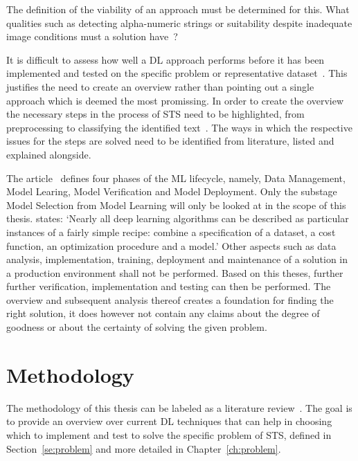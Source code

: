 The definition of the viability of an approach must be determined for this.
What qualities such as detecting alpha-numeric strings or suitability despite
inadequate image conditions must a solution have~\citep{ghosh_visual_2017, hu_gtc_2020}?

It is difficult to assess how well a \ac{DL} approach performs before it has been
implemented and tested on the specific problem or representative dataset~\citep{arpteg_software_2018}.
This justifies the need to create an overview rather than pointing out a single approach which is
deemed the most promissing.
In order to create the overview the necessary steps in the process of \ac{STS} need to be highlighted,
from preprocessing to classifying the identified
text~\citep{long_scene_2021, sourvanos_challenges_2018}.
The ways in which the respective issues for the steps are solved need to be
identified from literature, listed and explained alongside.

The article~\cite{ashmore_assuring_2021} defines four phases of the \ac{ML} lifecycle, namely,
Data Management, Model Learing, Model Verification and Model Deployment.
Only the substage Model Selection from Model Learning will only be looked at in the scope of this
thesis.
\cite{goodfellow_deep_2016} states:
`Nearly all deep learning algorithms can be described as particular instances of a fairly simple
recipe: combine a specification of a dataset, a cost function, an optimization procedure and a model.'
Other aspects such as data analysis, implementation, training, deployment and maintenance of a
solution in a production environment shall not be performed.
Based on this theses, further further verification, implementation and testing can then be performed.
The overview and subsequent analysis thereof creates a foundation for finding the right solution,
it does however not contain any claims about the degree of goodness or about the certainty of
solving the given problem.

\begin{comment}
Abgrenzung für Training NN
- no talk about Setup (preprocessing, weight initialization,regularization)
- No talk about training dynamics (learning rate,large batch training, hyperparameter)
- No after training ( transfer learning, model ensemble)
\end{comment}

\section{Methodology}\label{se:methodology}
The methodology of this thesis can be labeled as a literature review~\citep{snyder_literature_2019,
torraco_writing_2005}.
The goal is to provide an overview over current \ac{DL} techniques that can help in
choosing which to implement and test to solve the specific problem of \ac{STS}, defined in
Section~\ref{se:problem} and more detailed in Chapter~\ref{ch:problem}.

